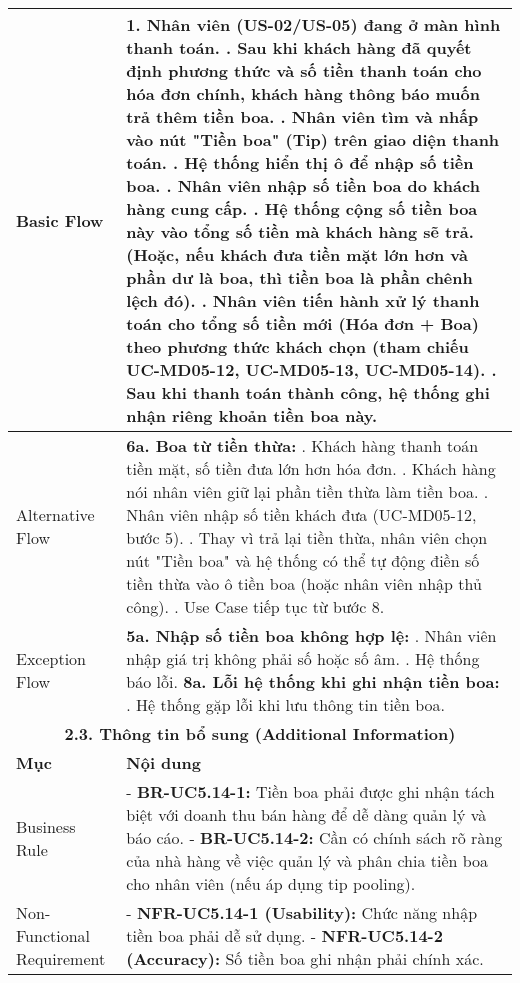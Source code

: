 \begin{longtable}{|m{4cm}|p{11cm}|}
Basic Flow & 1. Nhân viên (US-02/US-05) đang ở màn hình thanh toán. \newline 2. Sau khi khách hàng đã quyết định phương thức và số tiền thanh toán cho hóa đơn chính, khách hàng thông báo muốn trả thêm tiền boa. \newline 3. Nhân viên tìm và nhấp vào nút "Tiền boa" (Tip) trên giao diện thanh toán. \newline 4. Hệ thống hiển thị ô để nhập số tiền boa. \newline 5. Nhân viên nhập số tiền boa do khách hàng cung cấp. \newline 6. Hệ thống cộng số tiền boa này vào tổng số tiền mà khách hàng sẽ trả. (Hoặc, nếu khách đưa tiền mặt lớn hơn và phần dư là boa, thì tiền boa là phần chênh lệch đó). \newline 7. Nhân viên tiến hành xử lý thanh toán cho tổng số tiền mới (Hóa đơn + Boa) theo phương thức khách chọn (tham chiếu UC-MD05-12, UC-MD05-13, UC-MD05-14). \newline 8. Sau khi thanh toán thành công, hệ thống ghi nhận riêng khoản tiền boa này. \\
\hline
Alternative Flow & \textbf{6a. Boa từ tiền thừa:} \newline    1. Khách hàng thanh toán tiền mặt, số tiền đưa lớn hơn hóa đơn. \newline    2. Khách hàng nói nhân viên giữ lại phần tiền thừa làm tiền boa. \newline    3. Nhân viên nhập số tiền khách đưa (UC-MD05-12, bước 5). \newline    4. Thay vì trả lại tiền thừa, nhân viên chọn nút "Tiền boa" và hệ thống có thể tự động điền số tiền thừa vào ô tiền boa (hoặc nhân viên nhập thủ công). \newline    5. Use Case tiếp tục từ bước 8. \\
\hline
Exception Flow & \textbf{5a. Nhập số tiền boa không hợp lệ:} \newline    1. Nhân viên nhập giá trị không phải số hoặc số âm. \newline    2. Hệ thống báo lỗi. \newline \textbf{8a. Lỗi hệ thống khi ghi nhận tiền boa:} \newline    1. Hệ thống gặp lỗi khi lưu thông tin tiền boa. \\
\hline
\multicolumn{2}{|c|}{\textbf{2.3. Thông tin bổ sung (Additional Information)}} \\
\hline
\textbf{Mục} & \textbf{Nội dung} \\
\hline
Business Rule & - \textbf{BR-UC5.14-1:} Tiền boa phải được ghi nhận tách biệt với doanh thu bán hàng để dễ dàng quản lý và báo cáo. \newline - \textbf{BR-UC5.14-2:} Cần có chính sách rõ ràng của nhà hàng về việc quản lý và phân chia tiền boa cho nhân viên (nếu áp dụng tip pooling). \\
\hline
Non-Functional Requirement & - \textbf{NFR-UC5.14-1 (Usability):} Chức năng nhập tiền boa phải dễ sử dụng. \newline - \textbf{NFR-UC5.14-2 (Accuracy):} Số tiền boa ghi nhận phải chính xác. \\
\hline
\end{longtable}

